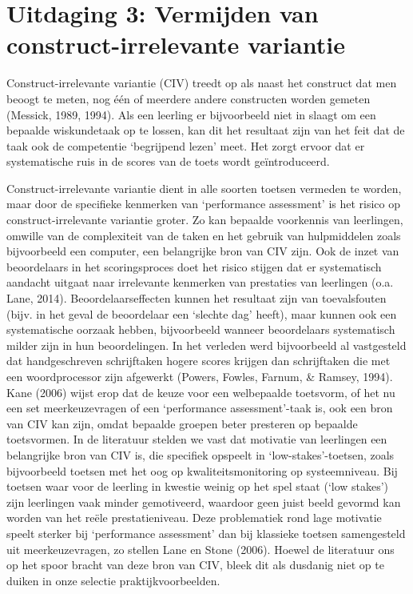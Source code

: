\documentclass[
  letterpaper,
]{report}
\begin{document}
\hypertarget{uitdaging-3-vermijden-van-construct-irrelevante-variantie}{%
\section{Uitdaging 3: Vermijden van construct-irrelevante
variantie}\label{uitdaging-3-vermijden-van-construct-irrelevante-variantie}}

Construct-irrelevante variantie (CIV) treedt op als naast het construct
dat men beoogt te meten, nog één of meerdere andere constructen worden
gemeten (Messick, 1989, 1994). Als een leerling er bijvoorbeeld niet in
slaagt om een bepaalde wiskundetaak op te lossen, kan dit het resultaat
zijn van het feit dat de taak ook de competentie `begrijpend lezen'
meet. Het zorgt ervoor dat er systematische ruis in de scores van de
toets wordt geïntroduceerd.

Construct-irrelevante variantie dient in alle soorten toetsen vermeden
te worden, maar door de specifieke kenmerken van `performance
assessment' is het risico op construct-irrelevante variantie groter. Zo
kan bepaalde voorkennis van leerlingen, omwille van de complexiteit van
de taken en het gebruik van hulpmiddelen zoals bijvoorbeeld een
computer, een belangrijke bron van CIV zijn. Ook de inzet van
beoordelaars in het scoringsproces doet het risico stijgen dat er
systematisch aandacht uitgaat naar irrelevante kenmerken van prestaties
van leerlingen (o.a. Lane, 2014). Beoordelaarseffecten kunnen het
resultaat zijn van toevalsfouten (bijv. in het geval de beoordelaar een
`slechte dag' heeft), maar kunnen ook een systematische oorzaak hebben,
bijvoorbeeld wanneer beoordelaars systematisch milder zijn in hun
beoordelingen. In het verleden werd bijvoorbeeld al vastgesteld dat
handgeschreven schrijftaken hogere scores krijgen dan schrijftaken die
met een woordprocessor zijn afgewerkt (Powers, Fowles, Farnum, \&
Ramsey, 1994). Kane (2006) wijst erop dat de keuze voor een welbepaalde
toetsvorm, of het nu een set meerkeuzevragen of een `performance
assessment'-taak is, ook een bron van CIV kan zijn, omdat bepaalde
groepen beter presteren op bepaalde toetsvormen. In de literatuur
stelden we vast dat motivatie van leerlingen een belangrijke bron van
CIV is, die specifiek opspeelt in `low-stakes'-toetsen, zoals
bijvoorbeeld toetsen met het oog op kwaliteitsmonitoring op
systeemniveau. Bij toetsen waar voor de leerling in kwestie weinig op
het spel staat (`low stakes') zijn leerlingen vaak minder gemotiveerd,
waardoor geen juist beeld gevormd kan worden van het reële
prestatieniveau. Deze problematiek rond lage motivatie speelt sterker
bij `performance assessment' dan bij klassieke toetsen samengesteld uit
meerkeuzevragen, zo stellen Lane en Stone (2006). Hoewel de literatuur
ons op het spoor bracht van deze bron van CIV, bleek dit als dusdanig
niet op te duiken in onze selectie praktijkvoorbeelden.
\end{document}
